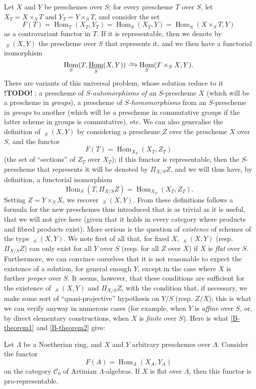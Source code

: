\documentclass{article}
\theoremstyle{plain}
\newenvironment{proposition}[1]
  {\renewcommand\theinnercustomproposition{#1}\innercustomproposition}
  {\endinnercustomproposition}
\theoremstyle{definition}
\newcommand{\cat}[1]{{\mathcal{#1}}}
\newcommand{\simto}{\xrightarrow{\raisebox{-0.7ex}[0ex][0ex]{$\sim$}}}
\DeclareMathOperator{\Hom}{Hom}
\DeclareMathOperator{\shHom}{\underline{\Hom}}
\newcommand{\todo}{\textbf{ !TODO! }}
\newcommand{\oldpage}[1]{\marginpar{\footnotesize$\Big\vert$ \textit{p.~#1}}}
\begin{document}
Let $X$ and $Y$ be preschemes over $S$;
for every prescheme $T$ over $S$,
\oldpage{195-13}
let $X_T=X\times_S T$ and $Y_T=Y\times_S T$, and consider the set
\[
  F(T)
  = \Hom_T(X_T,Y_T)
  = \Hom_S(X_T,Y)
  = \Hom_S(X\times_S T,Y)
\]
as a contravariant functor in $T$.
If it is representable, then we denote by $\shHom_S(X,Y)$ the prescheme over $S$ that represents it, and we then have a functorial isomorphism
\[
  \Hom_S(T,\shHom_S(X,Y)) \simto \Hom_S(T\times_S X,Y).
\]
There are variants of this universal problem, whose solution reduce to it \todo ; a prescheme of \emph{$S$-automorphisms of} an $S$-prescheme $X$ (which will be a prescheme in \emph{groups}), a prescheme of \emph{$S$-homomorphisms} from an $S$-prescheme in \emph{groups} to another (which will be a prescheme in commutative groups if the latter scheme in groups is commutative), etc.
We can also generalise the definition of $\shHom_S(X,Y)$ by considering a prescheme $Z$ over the prescheme $X$ over $S$, and the functor
\[
  F(T) = \Hom_{X_T}(X_T,Z_T)
\]
(the set of ``sections'' of $Z_T$ over $X_T$);
if this functor is representable, then the $S$-prescheme that represents it will be denoted by $\Pi_{X/S}Z$, and we will thus have, by definition, a functorial isomorphism
\[
  \Hom_S(T,\Pi_{X/S}Z) = \Hom_{X_T}(X_T,Z_T).
\]
Setting $Z=Y\times_S X$, we recover $\shHom_S(X,Y)$.
From these definitions follows a formula for the new preschemes thus introduced that is as trivial as it is useful, that we will not give here (given that it holds in every category where products and fibred products exist).
More serious is the question of \emph{existence} of schemes of the type $\shHom_S(X,Y)$.
We note first of all that, for fixed $X$, $\shHom_S(X,Y)$ (resp. $\Pi_{X/S}Z$) can only exist for all $Y$ over $S$ (resp. for all $Z$ over $X$) if $X$ is \emph{flat} over $S$.
Furthermore, we can convince ourselves that it is not reasonable to expect the existence of a solution, for general enough $Y$, except in the case where $X$ is further \emph{proper} over $S$.
It seems, however, that these conditions are sufficient for the existence of $\shHom_S(X,Y)$ and $\Pi_{X/S}Z$, with the condition that, if necessary, we make some sort of ``quasi-projective'' hypothesis on $Y/S$ (resp. $Z/X$);
this is what we can verify anyway in numerous cases (for example, when $Y$ is \emph{affine} over $S$, or, by direct elementary constructions, when $X$ is \emph{finite} over $S$).
Here is what \cref{B-theorem1} and \cref{B-theorem2} give:

\oldpage{195-14}
\begin{proposition}{2.1}
\label{B.2-proposition1}
  Let $\Lambda$ be a Noetherian ring, and $X$ and $Y$ arbitrary preschemes over $\Lambda$.
  Consider the functor
  \[
    F(A) = \Hom_A(X_A,Y_A)
  \]
  on the category $\cat{C}_0$ of Artinian $\Lambda$-algebras.
  If $X$ is flat over $\Lambda$, then this functor is pro-representable.
\end{proposition}
\end{document}
